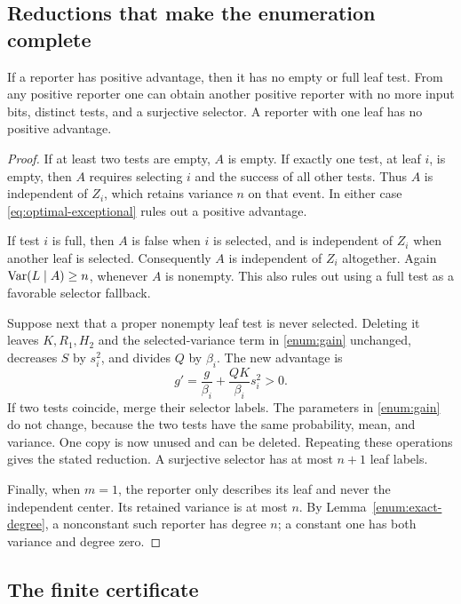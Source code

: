 \subsection{Reductions that make the enumeration complete}

\begin{lemma}
\label{enum:reductions}
If a reporter has positive advantage, then it has no empty or full
leaf test. From any positive reporter one can obtain another positive
reporter with no more input bits, distinct tests, and a surjective
selector. A reporter with one leaf has no positive advantage.
\end{lemma}

\begin{proof}
If at least two tests are empty, \(A\) is empty. If exactly one test,
at leaf \(i\), is empty, then \(A\) requires selecting \(i\) and
the success of all other tests. Thus \(A\) is independent of
\(Z_i\), which retains variance \(n\) on that event. In either
case \eqref{eq:optimal-exceptional} rules out a positive advantage.

If test \(i\) is full, then \(A\) is false when \(i\) is selected,
and is independent of \(Z_i\) when another leaf is selected.
Consequently \(A\) is independent of \(Z_i\) altogether. Again
\(\operatorname{Var}(L\mid A)\ge n\), whenever \(A\) is nonempty. This also
rules out using a full test as a favorable selector fallback.

Suppose next that a proper nonempty leaf test is never selected.
Deleting it leaves \(K,R_1,H_2\) and the selected-variance term in
\eqref{enum:gain} unchanged, decreases \(S\) by \(s_i^2\), and
divides \(Q\) by \(\beta_i\). The new advantage is
\[
 g'=\frac{g}{\beta_i}+\frac{QK}{\beta_i}s_i^2>0.
\]
If two tests coincide, merge their selector labels. The parameters
in \eqref{enum:gain} do not change, because the two tests have the
same probability, mean, and variance. One copy is now unused and
can be deleted. Repeating these operations gives the stated
reduction. A surjective selector has at most \(n+1\) leaf labels.

Finally, when \(m=1\), the reporter only describes its leaf and
never the independent center. Its retained variance is at most
\(n\). By Lemma~\ref{enum:exact-degree}, a nonconstant such
reporter has degree \(n\); a constant one has both variance and
degree zero.
\end{proof}

\subsection{The finite certificate}

